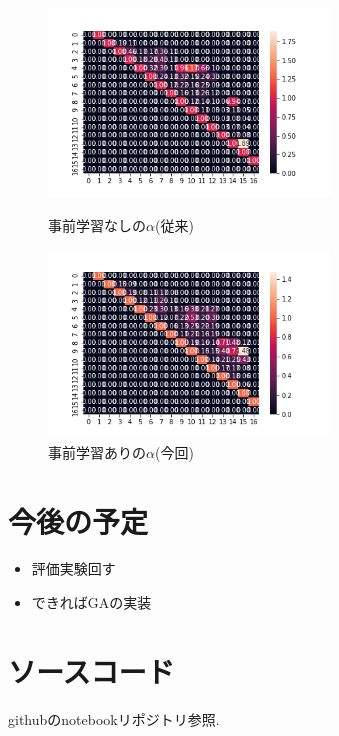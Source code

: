 \documentclass[twocolumn]{jarticle}     %
\begin{document}
\begin{figure}[tb]
 \begin{minipage}{0.5\hsize}
 	\begin{center}
 		\includegraphics[clip,width=75mm]{alpha_50_search.png}
 		\caption{事前学習なしの$\alpha$(従来)}
 		\label{fig:alpha}
 	\end{center}
 \end{minipage}
 \begin{minipage}{0.5\hsize}
 	\begin{center}
 		\includegraphics[clip,width=75mm]{alpha_50_pretrain_search.png}
 		\caption{事前学習ありの$\alpha$(今回)}
 		\label{fig:alpha_p}
 	\end{center}
 \end{minipage}
\end{figure}

\section{今後の予定}

\begin{itemize}
  \item 評価実験回す
  \item できればGAの実装
\end{itemize}

\section{ソースコード}
githubのnotebookリポジトリ参照.



\end{document}
